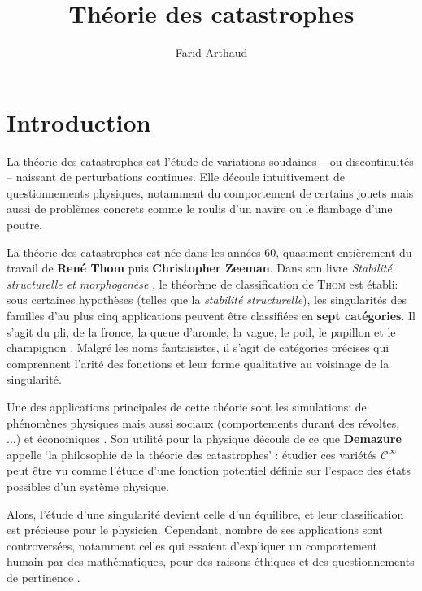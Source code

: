 \documentclass{article}
\newcommand{\cinf}{\mathcal{C}^\infty}
\theoremstyle{definition}
\begin{document}
%

\setcounter{page}{1}

\title{Théorie des catastrophes}
\author{Farid Arthaud}

\maketitle
\tableofcontents

\section{Introduction}

La théorie des catastrophes est l'étude de variations soudaines -- ou discontinuités -- naissant de perturbations continues.
Elle découle intuitivement de questionnements physiques, notamment du comportement de certains jouets \cite{bbcvid} mais aussi de problèmes concrets comme le roulis d'un navire \cite{poston} ou le flambage d'une poutre.

La théorie des catastrophes est née dans les années 60, quasiment entièrement du travail de \textbf{René Thom} puis \textbf{Christopher Zeeman}.
Dans son livre \textit{Stabilité structurelle et morphogenèse} \cite{thom}, le théorème de classification de \textsc{Thom} est établi: sous certaines hypothèses (telles que la \textit{stabilité structurelle}), les singularités des familles d'au plus cinq applications peuvent être classifiées en \textbf{sept catégories}.
Il s'agit du pli, de la fronce, la queue d'aronde, la vague, le poil, le papillon et le champignon \cite{wikipedia}.
Malgré les noms fantaisistes, il s'agit de catégories précises qui comprennent l'arité des fonctions et leur forme qualitative au voisinage de la singularité.

Une des applications principales de cette théorie sont les simulations: de phénomènes physiques mais aussi sociaux (comportements durant des révoltes, ...) et économiques \cite{bbcvid} \cite{poston}.
Son utilité pour la physique découle de ce que \textbf{Demazure} appelle `la philosophie de la théorie des catastrophes' \cite{demazure}: étudier ces variétés $\cinf$ peut être vu comme l'étude d'une fonction potentiel définie sur l'espace des états possibles d'un système physique.

Alors, l'étude d'une singularité devient celle d'un équilibre, et leur classification est précieuse pour le physicien.
Cependant, nombre de ses applications sont controversées, notamment celles qui essaient d'expliquer un comportement humain par des mathématiques, pour des raisons éthiques et des questionnements de pertinence \cite{wikipedia}.
\end{document}
